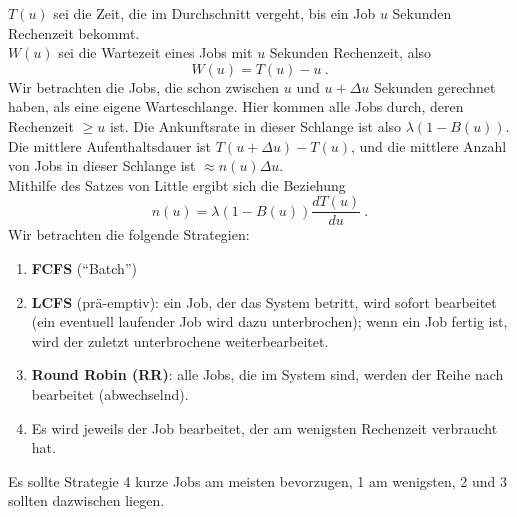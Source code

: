 $T(u)$ sei die Zeit, die im Durchschnitt vergeht, bis ein Job $u$ Sekunden Rechenzeit bekommt. \\
$W(u)$ sei die Wartezeit eines Jobs mit $u$ Sekunden Rechenzeit, also
\[W(u) = T(u) - u ~. \]
Wir betrachten die Jobs, die schon zwischen $u$ und $u+\Delta u$ Sekunden gerechnet haben, als eine eigene Warteschlange. Hier kommen alle Jobs durch, deren
Rechenzeit $\geq u$ ist. Die Ankunftsrate in dieser Schlange ist also $\lambda(1-B(u))$.\\
Die mittlere Aufenthaltsdauer ist $T(u+\Delta u) - T(u)$, und die mittlere Anzahl von Jobs in dieser Schlange ist $\approx n(u)\Delta u$. \\
Mithilfe des Satzes von Little ergibt sich die Beziehung
\[n(u)=\lambda (1-B(u))\frac{dT(u)}{du} ~.  \]
Wir betrachten die folgende Strategien:
\begin{enumerate}
\item {\bf FCFS} (\enquote{Batch})
\item {\bf LCFS} (prä-emptiv): ein Job, der das System betritt, wird sofort bearbeitet (ein eventuell laufender Job wird dazu unterbrochen); wenn ein Job fertig
ist, wird der zuletzt unterbrochene weiterbearbeitet.
\item {\bf {}Round Robin (RR)}: alle Jobs, die im System sind, werden der Reihe nach bearbeitet (abwechselnd).
\item Es wird jeweils der Job bearbeitet, der am wenigsten Rechenzeit verbraucht hat.
\end{enumerate}
Es sollte Strategie 4 kurze Jobs am meisten bevorzugen, 1 am wenigsten, 2 und 3 sollten dazwischen liegen.

